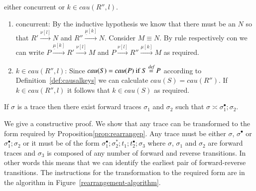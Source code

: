\begin{subappendices}
\begin{pf}
\begin{enumerate}
\begin{enumerate}
{either concurrent or $k \in cau(R'',l)$.
\begin{enumerate}
	\item concurrent: By the inductive hypothesis we know that there must be an $N$ so that $R' \xrightarrow{\nu[l]} N$ and $R'' \xrightarrow{\underline{\mu}[k]} N$. Consider $M \equiv N $. By rule 
	respectively con we can write $P\xrightarrow{\underline{\mu}[k]} R' \xrightarrow{\nu[l]} M$ and $P\xrightarrow{\nu[l]} R'' \xrightarrow{\mu[k]} M$ as required.
\item $k \in cau(R'',l)$: Since $cau(S) = cau(P) \mbox{ if }S \stackrel{\emph{def}}{=} P$ according to Definition~\ref{def:causalkeys} we can calculate $cau(S)=cau(R'')$. If $k \in cau(R'',l)$ it follows that $k \in cau(S)$ as required.
\end{enumerate}
}
\end{enumerate}
\end{enumerate}
\end{pf}

\begin{proposition}[Rearrangement]\label{prop:rearrangep}
If $\sigma$ is a trace then there exist forward traces 
$\sigma_1$ and $\sigma_2$ such that $\sigma \asymp \sigma_1^\bullet;\sigma_2$.
\end{proposition}

\begin{pf}
We give a constructive proof. We show that any trace can be transformed to the form required
	by Proposition\ref{prop:rearrangep}.  Any trace must be either $\sigma$, $\sigma^\bullet$ or $\sigma_1^\bullet;\sigma_2$ or it must be of the form $\sigma_1^\bullet;\sigma_2^*;t_1;t_2^\bullet;\sigma_3$ where $\sigma$, $\sigma_1$ and $\sigma_2$ are forward traces and $\sigma_3$ is composed of any number of forward and reverse transitions. In other words this means that we can identify the earliest pair of forward-reverse transitions. The instructions for the transformation to the required form are in the algorithm in 
Figure~\ref{rearrangement-algorithm}.


\end{pf}
\end{subappendices}
